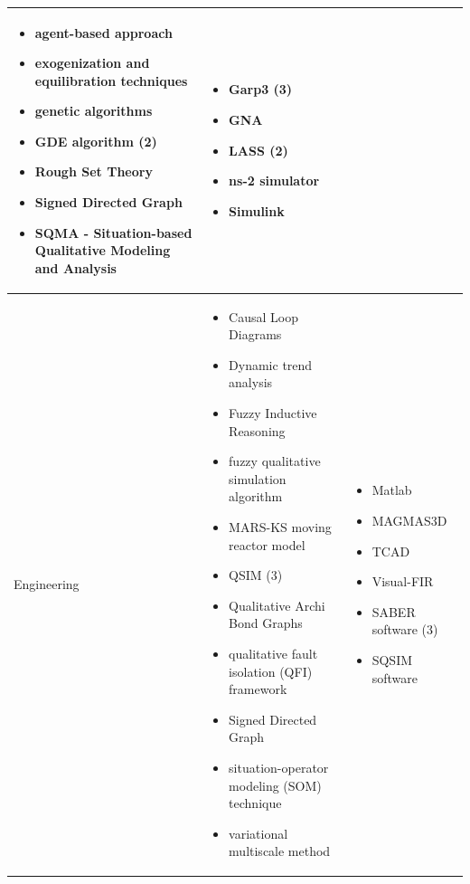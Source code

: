 \documentclass[utf8]{gradu3}
\begin{document}
\begin{longtable}[h]{|p{4cm}|p{6cm}|p{5cm}|}
\begin{itemize}
        \item agent-based approach
        \item exogenization and equilibration techniques
        \item genetic algorithms
        \item GDE algorithm (2)
        \item Rough Set Theory
        \item Signed Directed Graph
        \item SQMA - Situation-based Qualitative Modeling and Analysis
    \end{itemize} & 
    \begin{itemize}
        \item Garp3 (3)
        \item GNA
        \item LASS (2)
        \item ns-2 simulator
        \item Simulink
    \end{itemize}
    \\
    \hline
    Engineering & \begin{itemize}
        \item Causal Loop Diagrams
        \item Dynamic trend analysis
        \item Fuzzy Inductive Reasoning
        \item fuzzy qualitative simulation algorithm
        \item MARS-KS moving reactor model
        \item QSIM (3)
        \item Qualitative Archi Bond Graphs
        \item qualitative fault isolation (QFI) framework
        \item Signed Directed Graph
        \item situation-operator modeling (SOM) technique
        \item variational multiscale method
    \end{itemize} &
    \begin{itemize}
        \item Matlab
        \item MAGMAS3D
        \item TCAD
        \item Visual-FIR
        \item SABER software (3)
        \item SQSIM software

\end{itemize}
\end{longtable}
\end{document}
